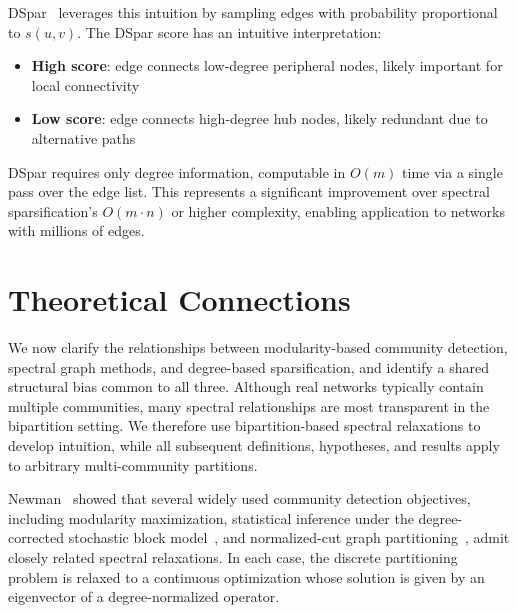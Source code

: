 \documentclass[10pt,journal,compsoc]{IEEEtran}
\begin{document}
DSpar~\cite{liu2023dspar} 
leverages this intuition by sampling edges with probability proportional 
to $s(u,v)$.
The DSpar score has an intuitive interpretation:
\begin{itemize}
    \item \textbf{High score}: edge connects low-degree peripheral 
          nodes, likely important for local connectivity
    \item \textbf{Low score}: edge connects high-degree hub 
          nodes, likely redundant due to alternative paths
\end{itemize}

DSpar requires only degree information, computable in $O(m)$ time via a 
single pass over the edge list. This represents a significant improvement 
over spectral sparsification's $O(m \cdot n)$ or higher complexity, 
enabling application to networks with millions of edges.

\section{Theoretical Connections}
\label{sec:theory}

We now clarify the relationships between modularity-based community detection,
spectral graph methods, and degree-based sparsification, and identify a
shared structural bias common to all three.
Although real networks typically contain multiple communities, many spectral
relationships are most transparent in the bipartition setting. We therefore
use bipartition-based spectral relaxations to develop intuition, while all
subsequent definitions, hypotheses, and results apply to arbitrary
multi-community partitions.

Newman~\cite{newman2013spectral} showed that several widely used community
detection objectives, including modularity maximization, statistical inference
under the degree-corrected stochastic block model~\cite{karrer2011stochastic},
and normalized-cut graph partitioning~\cite{shi2000normalized}, admit closely
related spectral relaxations. In each case, the discrete partitioning
problem is relaxed to a continuous optimization whose solution is given by
an eigenvector of a degree-normalized operator.
\end{document}
